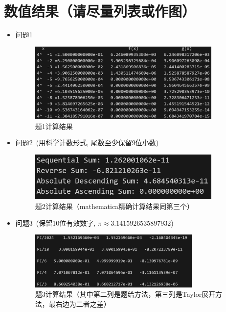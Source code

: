 \documentclass[10pt,a4paper,oneside]{article}
\begin{document}
\section{数值结果（请尽量列表或作图）}
\begin{itemize}
  \item 问题1
\begin{figure}[H]
  \centering
  \includegraphics[width=0.9\textwidth]{屏幕截图 2024-09-12 184759.png} 
  \caption{题1计算结果}
\end{figure}

\item  问题2~(用科学计数形式, 尾数至少保留9位小数)

\begin{figure}[H]
  \centering
  \includegraphics[width=0.9\textwidth]{屏幕截图 2024-09-06 223952.png}
  \caption{题2计算结果（mathematica精确计算结果同第三个）}
\end{figure}


 \item  问题3~(保留10位有效数字, $\pi \approx 3.14159 26535 897932$)
 \begin{figure}[H]
  \centering
  \includegraphics[width=0.8\textwidth]{屏幕截图 2024-09-07 133238.png}
  \caption{题3计算结果（其中第二列是题给方法，第三列是Taylor展开方法，最右边为二者之差）}
\end{figure}
 

\end{itemize}
\end{document}
